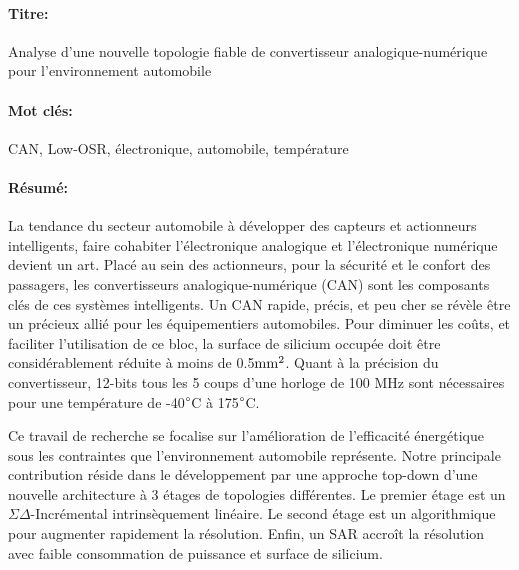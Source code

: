 \begin{mdframed}[linecolor=Prune,linewidth=1]
\fontsize{7}{9}\selectfont
\vspace{-.25cm}
\paragraph*{Titre:} Analyse d’une nouvelle topologie fiable de convertisseur analogique-numérique pour l'environnement automobile

\begin{small}
\vspace{-.5cm}
\paragraph*{Mot clés:} 
\fontsize{7}{9}\selectfont
CAN, Low-OSR, électronique, automobile, température
\vspace{-.5cm}
\begin{multicols}{2}
\fontsize{7}{9}\selectfont
\paragraph*{Résumé:} 
La tendance du secteur automobile à développer des capteurs et actionneurs intelligents, faire cohabiter l'électronique analogique et l'électronique numérique devient un art. Placé au sein des actionneurs, pour la sécurité et le confort des passagers, les convertisseurs analogique-numérique (CAN) sont les composants clés de ces systèmes intelligents. Un CAN rapide, précis, et peu cher se révèle être un précieux allié pour les équipementiers automobiles. Pour diminuer les coûts, et faciliter l’utilisation de ce bloc, la surface de silicium occupée doit être considérablement réduite à moins de 0.5$\rm mm^2$. Quant à la précision du convertisseur, 12-bits tous les 5 coups d'une horloge de 100 MHz sont nécessaires pour une température de -40\(\degree \)C à 175\(\degree \)C.

Ce travail de recherche se focalise sur l'amélioration de l'efficacité énergétique sous les contraintes que l'environnement automobile représente. Notre principale contribution réside dans le développement par une approche top-down d'une nouvelle architecture à 3 étages de topologies différentes. Le premier étage est un $\Sigma\Delta$-Incrémental intrinsèquement linéaire. Le second étage est un algorithmique pour augmenter rapidement la résolution. Enfin, un SAR accroît la résolution avec faible consommation de puissance et surface de silicium.


\end{multicols}
\end{small}
\end{mdframed}
